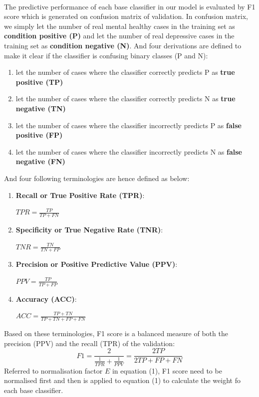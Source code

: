 \documentclass[runningheads]{llncs}
\begin{document}
\paragraph{}
The predictive performance of each base classifier in our model is evaluated by F1 score which is generated on confusion matrix of validation. In confusion matrix, we simply let the number of real mental healthy cases in the training set as \textbf{condition positive (P)} and let the number of real depressive cases in the training set as  \textbf{condition negative (N)}. And four derivations are defined to make it clear if the classifier is confusing binary classes (P and N):  \\
\begin{enumerate}[label=(\roman*)]
\item let the number of cases where the classifier correctly predicts P as \textbf{ true positive (TP)}
\item let the number of cases where the classifier correctly predicts N as \textbf{true negative (TN)}
\item let the number of cases where the classifier incorrectly predicts P as \textbf{false positive (FP)}
\item let the number of cases where the classifier incorrectly predicts N as \textbf{false negative (FN)}
\end{enumerate}
And four following terminologies are hence defined as below:
\begin{enumerate}[label=\alph*)]
\item \textbf{ Recall or True Positive Rate (TPR)}: \\ 
		\begin{center} $\displaystyle TPR = \frac{TP}{TP + FN} $ \end{center}
\item \textbf{Specificity or True Negative Rate (TNR)}: \\ 
		\begin{center} $\displaystyle TNR = \frac{TN}{TN + FP} $ \end{center}
\item \textbf{Precision or Positive Predictive Value (PPV)}: \\
		\begin{center} $\displaystyle PPV = \frac{TP}{TP + FP} $ \end{center}
\item \textbf{Accuracy (ACC)}: \\ 
		\begin{center} $\displaystyle ACC = \frac{TP + TN}{TP + TN + FP + FN} $ \end{center}
\end{enumerate}
Based on these terminologies, F1 score is a balanced measure of both the precision (PPV) and the recall (TPR) of the validation: 
\begin{equation}\label{reio}
	F1 = \frac{2 }{\frac{1}{TPR} + \frac{1}{PPV}} = \frac{2TP}{2TP + FP + FN}
\end{equation}
Referred to normalisation factor $E$ in equation (1), F1 score need to be normalised first and then is applied to equation (1) to calculate the weight fo each base classifier. 
%
%
%
%
\end{document}
